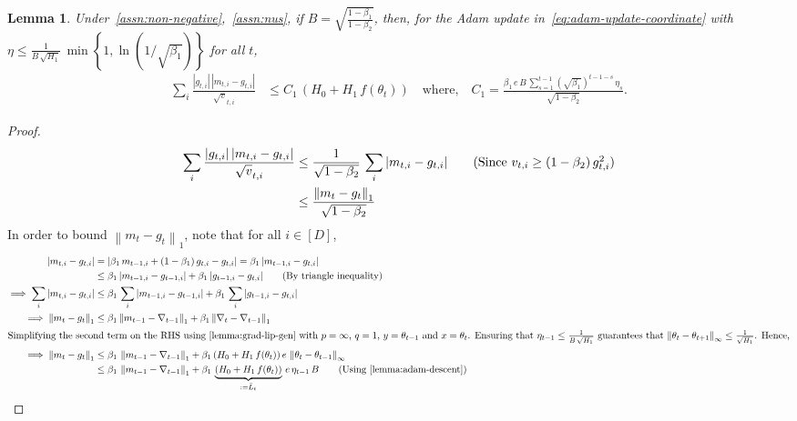 \documentclass{article}
\newtheorem{lemma}{Lemma}
\newcommand{\ti}[1]{#1_{t,i}}
\newcommand{\tpi}[1]{#1_{t-1,i}}
\newcommand{\norm}[1]{\left\|#1 \right\|}
\newcommand{\tht}{\theta_t}
\newcommand{\thtt}{\theta_{t+1}}
\begin{document}
\begin{lemma}
Under~\cref{assn:non-negative},~\cref{assn:nus}, if $B = \sqrt{\frac{1 - \beta_1}{1 - \beta_2}}$, then, for the Adam update in~\cref{eq:adam-update-coordinate} with $\eta \leq \frac{1}{B \, \sqrt{H_1}} \, \min\left\{1 , \ln(1/\sqrt{\beta_1}) \right\}$ for all $t$,
\begin{align*}
\sum_i \frac{|\ti{g}| \, |\ti{m} - \ti{g}|}{\ti{\sqrt{v}}} &\leq C_1 \, (H_0 + H_1 \, f(\tht)) \quad \text{where,} \quad C_1 = \frac{\beta_1\,e \, B \, \sum_{s = 1}^{t-1} (\sqrt{\beta_1})^{t-1-s} \, \eta_{s}}{\sqrt{1 - \beta_2}}. 
\end{align*}
\label{lemma:adam-mom-bound}
\end{lemma}
\begin{proof}
\begin{align}
\sum_i \frac{|\ti{g}| \, |\ti{m} - \ti{g}|}{\ti{\sqrt{v}}} &\leq \frac{1}{\sqrt{1 - \beta_2}} \, \sum_i |\ti{m} - \ti{g}| \tag{Since $\ti{v} \geq (1 - \beta_2) \, \ti{g^2}$} \\
& \leq \frac{\norm{m_t - g_t}_1}{\sqrt{1 - \beta_2}} \label{eq:adam-1pl-mom-recursion-1}
\end{align}
In order to bound $\norm{m_t - g_t}_1$, note that for all $i \in [D]$,
\begin{align}
|\ti{m} - \ti{g}| &= |\beta_1 \, \tpi{m} + (1-\beta_1) \, \ti{g} - \ti{g}| = \beta_1 \, |\tpi{m} - \ti{g}| \\
& \leq \beta_1 \, |\tpi{m} - \tpi{g}| + \beta_1 \, |\tpi{g} - \ti{g}| \tag{By triangle inequality} \\
\implies \sum_i |\ti{m} - \ti{g}| & \leq \beta_1 \, \sum_i |\tpi{m} - \tpi{g}| + \beta_1 \, \sum_i |\tpi{g} - \ti{g}| \nonumber \\
\implies \norm{m_t - g_t}_1 & \leq \beta_1 \norm{m_{t-1}  - \nabla_{t-1}}_1 + \beta_1 \norm{\nabla_t - \nabla_{t-1}}_1 \nonumber \\
\intertext{Simplifying the second term on the RHS using~\cref{lemma:grad-lip-gen} with $p = \infty$, $q = 1$, $y = \theta_{t-1}$ and $x = \theta_t$. Ensuring that $\eta_{t-1} \leq \frac{1}{B \, \sqrt{H_1}}$ guarantees that $\norm{\tht - \thtt}_\infty \leq \frac{1}{\sqrt{H_1}}$. Hence,} 
\implies\norm{m_t - g_t}_1& \leq \beta_1 \, \norm{m_{t-1}  - \nabla_{t-1}}_1 + \beta_1 \, (H_0 + H_1 \, f(\tht)) \, e \, \norm{\tht - \theta_{t-1}}_{\infty} \nonumber \\
& \leq \beta_1 \, \norm{m_{t-1}  - \nabla_{t-1}}_{1} + \beta_1 \, \underbrace{(H_0 + H_1 \, f(\tht))}_{:= \bar{L}_t} \, e \, \eta_{t-1} \, B \tag{Using~\cref{lemma:adam-descent}} \\

\end{align}
\end{proof}
\end{document}
